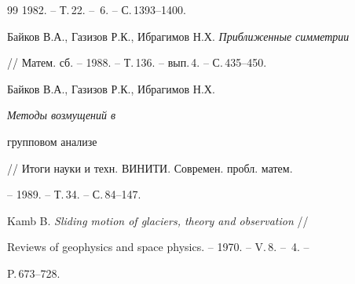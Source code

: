 \begin{thebibliography}{99}
1982. -- Т.\,22. -- \No\,6. -- С.\,1393--1400.




Байков В.А., Газизов Р.К., Ибрагимов Н.Х. {\em Приближенные симметрии}


// Матем. сб. -- 1988. -- Т.\,136. -- вып.\,4. -- С.\,435--450.




Байков В.А., Газизов Р.К., Ибрагимов Н.Х. {\em Методы возмущений в


групповом анализе} // Итоги науки и техн. ВИНИТИ. Современ. пробл. матем.


-- 1989. -- Т.\,34. -- С.\,84--147.




Kamb B. {\em Sliding motion of glaciers, theory and observation} //


Reviews of geophysics and space physics. -- 1970. -- V.\,8. -- \No\,4. --


P.\,673--728.





\end{thebibliography}





\vskip 2cm















